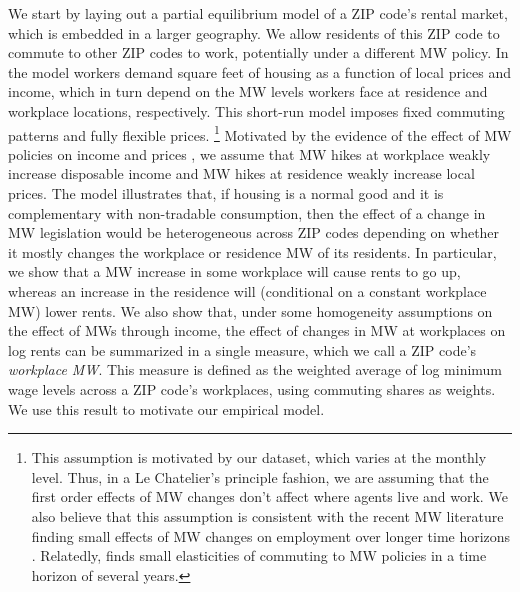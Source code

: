 We start by laying out a partial equilibrium model of a ZIP code's rental market,
which is embedded in a larger geography.
We allow residents of this ZIP code to commute to other ZIP codes to work, 
potentially under a different MW policy.
In the model workers demand square feet of housing as a function of local prices 
and income, which in turn depend on the MW levels workers face at residence and 
workplace locations, respectively.
This short-run model imposes fixed commuting patterns and fully flexible prices.%
\footnote{This assumption is motivated by our dataset, which varies at the monthly 
	level. Thus, in a Le Chatelier's principle fashion, we are assuming that the 
	first order effects of MW changes don't affect where agents live and work.
We also believe that this assumption is consistent with the recent MW literature
finding small effects of MW changes on employment over longer time horizons
\parencite[see][for a review]{Dube2019}.
Relatedly, \textcite{PerezPerez2021} finds small elasticities of commuting to MW 
policies in a time horizon of several years.}
Motivated by the evidence of the effect of MW policies on income 
\parencite{Dube2019Income, CegnizEtAl2019} and prices 
\parencite{AllegrettoReich2018, Leung2021}, we assume that MW hikes at workplace 
weakly increase disposable income and MW hikes at residence weakly increase 
local prices. The model illustrates that, if housing is a normal good and it 
is complementary with non-tradable consumption, then the effect of a change in 
MW legislation would be heterogeneous across ZIP codes depending on whether it 
mostly changes the workplace or residence MW of its residents.
In particular, we show that a MW increase in some workplace will cause rents to 
go up, whereas an increase in the residence will (conditional on a constant 
workplace MW) lower rents.
We also show that, under some homogeneity assumptions on the effect of MWs 
through income, the effect of changes in MW at workplaces on log rents can be 
summarized in a single measure, which we call a ZIP code's \textit{workplace MW}.
This measure is defined as the weighted average of log minimum wage levels 
across a ZIP code's workplaces, using commuting shares as weights.
We use this result to motivate our empirical model.


